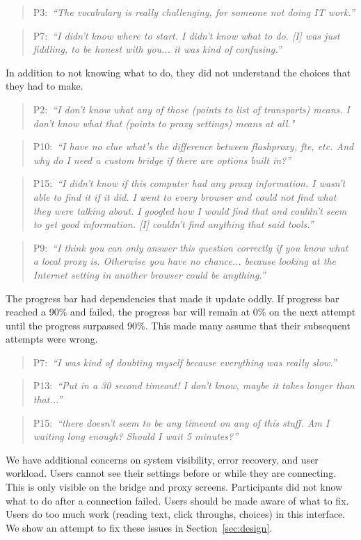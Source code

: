 \documentclass[USenglish,oneside,twocolumn]{article}
\newcommand{\pquote}[2]{
\begin{quotation}
\noindent #1:~\textit{#2}
\end{quotation}
}
\begin{document}
\pquote{P3}{``The vocabulary is really challenging, for someone not doing IT work.''}

\pquote{P7}{``I didn't know where to start. I didn't know what to do. [I] was just fiddling, to be honest with you... it was kind of confusing.''}

In addition to not knowing what to do, they did not understand the choices that they had to make. 

\pquote{P2}{``I don't know what any of those (points to list of transports) means. I don't know what that (points to proxy settings) means at all."}

\pquote{P10}{``I have no clue what's the difference between flashproxy, fte, etc. And why do I need a custom bridge if there are options built in?''}

\pquote{P15}{``I didn't know if this computer had any proxy information. I wasn't able to find it if it did. I went to every browser and could not find what they were talking about. I googled how I would find that and couldn't seem to get good information. [I] couldn't find anything that said tools.''}

\pquote{P9}{``I think you can only answer this question correctly if you know what a local proxy is.
Otherwise you have no chance... because looking at the Internet setting in another browser could be anything.''}

The progress bar had dependencies that made it update oddly. If progress bar reached a 90\% and failed, the progress bar will remain at 0\% on the next attempt until the progress surpassed 90\%. This made many assume that their subsequent attempts were wrong.

\pquote{P7}{``I was kind of doubting myself because everything was really slow.''}

\pquote{P13}{``Put in a 30 second timeout! I don't know, maybe it takes longer than that...''}

\pquote{P15}{``there doesn't seem to be any timeout on any of this stuff. Am I waiting long enough? Should I wait 5 minutes?''}

We have additional concerns on system visibility, error recovery, and user workload. Users cannot see their settings before or while they are connecting. This is only visible on the bridge and proxy screens. Participants did not know what to do after a connection failed. Users should be made aware of what to fix. Users do too much work (reading text, click throughs, choices) in this interface. We show an attempt to fix these issues in Section~\ref{sec:design}.
\end{document}
